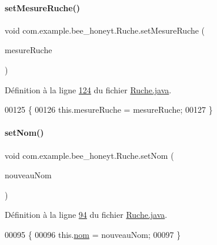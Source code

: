 \paragraph{\texorpdfstring{set\+Mesure\+Ruche()}{setMesureRuche()}}
{\footnotesize\ttfamily void com.\+example.\+bee\+\_\+honeyt.\+Ruche.\+set\+Mesure\+Ruche (\begin{DoxyParamCaption}\item[{\hyperlink{classcom_1_1example_1_1bee__honeyt_1_1_mesure_ruche}{Mesure\+Ruche}}]{mesure\+Ruche }\end{DoxyParamCaption})}



Définition à la ligne \hyperlink{_ruche_8java_source_l00124}{124} du fichier \hyperlink{_ruche_8java_source}{Ruche.\+java}.


\begin{DoxyCode}
00125     \{
00126         this.mesureRuche = mesureRuche;
00127     \}
\end{DoxyCode}
\mbox{\label{classcom_1_1example_1_1bee__honeyt_1_1_ruche_aae5d95d914d3d2c2e72c4bb9e9ab03f4}} 
\paragraph{\texorpdfstring{set\+Nom()}{setNom()}}
{\footnotesize\ttfamily void com.\+example.\+bee\+\_\+honeyt.\+Ruche.\+set\+Nom (\begin{DoxyParamCaption}\item[{String}]{nouveau\+Nom }\end{DoxyParamCaption})}



Définition à la ligne \hyperlink{_ruche_8java_source_l00094}{94} du fichier \hyperlink{_ruche_8java_source}{Ruche.\+java}.


\begin{DoxyCode}
00095     \{
00096         this.\hyperlink{classcom_1_1example_1_1bee__honeyt_1_1_ruche_ac72094a8a08cf8f485be1456863bc4bd}{nom} = nouveauNom;
00097     \}
\end{DoxyCode}
\mbox{\label{classcom_1_1example_1_1bee__honeyt_1_1_ruche_a76fb01b4b1fd90662907635efe949a9e}} 
